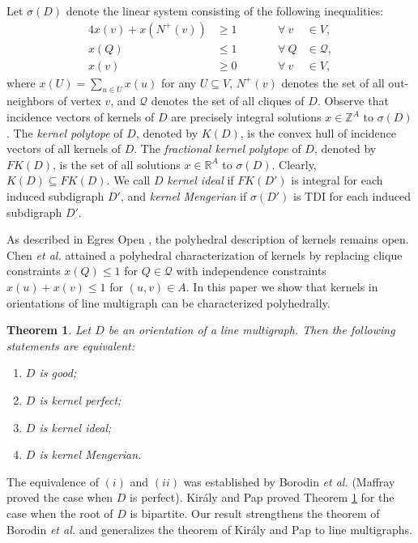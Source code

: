 \documentclass[11pt]{article}
\newtheorem{theorem}{Theorem}%
\numberwithin{theorem}{section}
\begin{document}
Let $\sigma(D)$ denote the linear system consisting of the following inequalities:
\begin{alignat}{4}
x(v)+x(N^+(v)) &\geq 1 &\qquad &\forall ~ v~&\in V, \label{domination constraints}\\
x(Q)&\leq 1 &\qquad &\forall ~ Q &\in \mathcal{Q}, \label{independence constraints}\\
x(v) &\geq 0 &\qquad &\forall ~ v~&\in V, \label{vertex nonnegativity}
\end{alignat}
where $x(U)=\sum_{u\in U}x(u)$ for any $U\subseteq V$, $N^+(v)$ denotes the set of all out-neighbors of vertex $v$, and $\mathcal{Q}$ denotes the set of all cliques of $D$. Observe that incidence vectors of kernels of $D$ are precisely integral solutions $x\in \mathbb{Z}^A$ to $\sigma(D)$.
The \textit{kernel polytope} of $D$, denoted by $K(D)$, is the convex hull of incidence vectors of all kernels of $D$.  The \textit{fractional kernel polytope} of $D$, denoted by $FK(D)$, is the set of all solutions $x\in \mathbb{R}^A$ to $\sigma(D)$. Clearly, $K(D)\subseteq FK(D)$.
We call $D$ \textit{kernel ideal} if $FK(D')$ is integral for each induced subdigraph $D'$, and \textit{kernel Mengerian} if $\sigma(D')$ is TDI for each induced subdigraph $D'$.

As described in Egres Open \cite{Egres}, the polyhedral description of kernels remains open. Chen \textit{et al.} \cite{ChenChen} attained a polyhedral characterization of kernels by replacing clique constraints $x(Q)\leq 1$ for $Q\in\mathcal{Q}$ with independence constraints $x(u)+x(v)\leq 1$ for $(u,v)\in A$.
In this paper we show that kernels in orientations of line multigraph can be characterized polyhedrally.

\begin{theorem}
\label{thm:main}
Let $D$ be an orientation of a line multigraph. Then the following statements are equivalent:
\begin{enumerate}[label={\emph{(}\roman*\emph{)}}]
	\item $D$ is good;
	\item $D$ is kernel perfect;
	\item $D$ is kernel ideal;
	\item $D$ is kernel Mengerian.
\end{enumerate}
\end{theorem}

The equivalence of $(i)$ and $(ii)$ was established by Borodin \textit{et al.} \cite{BoroKost98} (Maffray \cite{Maff92} proved the case when $D$ is perfect). Kir\'{a}ly and Pap \cite{KiraPap08} proved Theorem \ref{thm:main} for the case when the root of $D$ is bipartite.
Our result strengthens the theorem of Borodin \textit{et al.} \cite{BoroKost98} and generalizes the theorem of Kir\'{a}ly and Pap \cite{KiraPap08} to line multigraphs.
\end{document}
